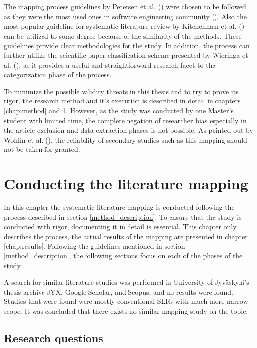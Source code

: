 The mapping process guidelines by Petersen et al.
(\cite*{petersen2008,petersen2015}) were chosen to be followed as they were the
most used ones in software engineering community (\cite{petersen2015}). Also the
most popular guideline for systematic literature review by Kitchenham et al.
(\cite*{kitchenham2007}) can be utilized to some degree because of the
similarity of the methods. These guidelines provide clear methodologies for the
study. In addition, the process can further utilize the scientific paper
classification scheme presented by Wieringa et al. (\cite{wieringa2006}), as it
provides a useful and straightforward research facet to the categorization phase
of the process.

To minimize the possible validity threats in this thesis and to try to prove its
rigor, the research method and it's execution is described in detail in chapters
\ref{chap:method} and \ref{chap:conducting}. However, as the study was conducted
by one Master's student with limited time, the complete negation of researcher
bias especially in the article exclusion and data extraction phases is not
possible. As pointed out by Wohlin et al. (\cite*{wohlin2013}), the reliability
of secondary studies such as this mapping should not be taken for granted.


\chapter{Conducting the literature mapping}
\label{chap:conducting}

In this chapter the systematic literature mapping is conducted following the
process described in section \ref{method_description}. To ensure that the study is
conducted with rigor, documenting it in detail is essential. This chapter only
describes the process, the actual results of the mapping are presented in
chapter \ref{chap:results}. Following the guidelines mentioned in section
\ref{method_description}, the following sections focus on each of the phases of
the study.

A search for similar literature studies was performed in University of
Jyväskylä's thesis archive JYX, Google Scholar, and Scopus, and no results were
found. Studies that were found were mostly conventional SLRs with much more
narrow scope. It was concluded that there exists no similar mapping study on the
topic.

\section{Research questions}

